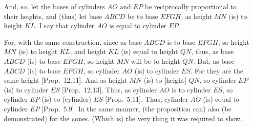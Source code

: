 \begin{Parallel}{}{}
{And, so, let the bases of cylinders $AO$ and $EP$ be reciprocally proportional to their heights, and (thus) let
base $ABCD$ be to base $EFGH$, as height $MN$ (is) to height $KL$. I say that cylinder $AO$ is equal to
cylinder $EP$.

For, with the same construction, since  as base $ABCD$ is to base $EFGH$, so  height $MN$ (is) to height $KL$, and
height $KL$ (is) equal to height $QN$, thus, as base $ABCD$ (is) to base $EFGH$, so height $MN$ will be to height $QN$.
But, as base $ABCD$ (is) to base $EFGH$, so cylinder $AO$ (is) to cylinder $ES$. For they are the same height [Prop.~12.11]. 
And as height $MN$ (is) to [height] $QN$, so cylinder $EP$ (is) to cylinder $ES$ [Prop.~12.13].
Thus, as cylinder $AO$ is to cylinder $ES$, so cylinder $EP$ (is) to (cylinder) $ES$ [Prop.~5.11]. Thus, cylinder $AO$ (is)
equal to cylinder $EP$ [Prop.~5.9]. In the same manner, (the proposition can) also (be demonstrated)
for the cones. (Which is) the very thing it was required to show.}
\end{Parallel}

